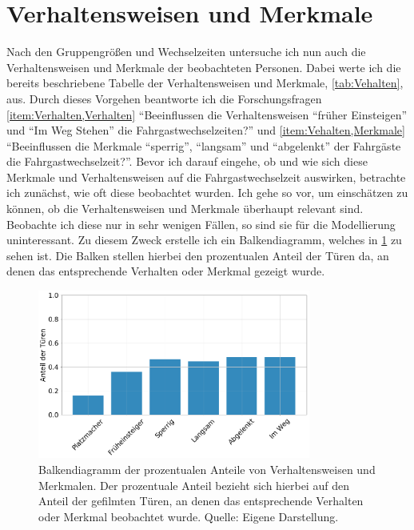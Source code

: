 \section{Verhaltensweisen und Merkmale} \label{Verhalten}
Nach den Gruppengrößen und Wechselzeiten untersuche ich nun auch die Verhaltensweisen und Merkmale der beobachteten Personen. Dabei werte ich die bereits beschriebene Tabelle der Verhaltensweisen und Merkmale, \tablename \ref{tab:Vehalten}, aus. Durch dieses Vorgehen beantworte ich die Forschungsfragen \ref{item:Verhalten,Verhalten} "`Beeinflussen die Verhaltensweisen "`früher Einsteigen"' und "`Im Weg Stehen"' die Fahrgastwechselzeiten?"' und \ref{item:Vehalten,Merkmale} "`Beeinflussen die Merkmale "`sperrig"', "`langsam"' und "`abgelenkt"' der Fahrgäste die Fahrgastwechselzeit?"'. Bevor ich darauf eingehe, ob und wie sich diese Merkmale und Verhaltensweisen auf die Fahrgastwechselzeit auswirken, betrachte ich zunächst, wie oft diese beobachtet wurden. Ich gehe so vor, um einschätzen zu können, ob die Verhaltensweisen und Merkmale überhaupt relevant sind. Beobachte ich diese nur in sehr wenigen Fällen, so sind sie für die Modellierung uninteressant. Zu diesem Zweck erstelle ich ein Balkendiagramm, welches in \figurename \ref{fig:BalkenVerhalten} zu sehen ist. Die Balken stellen hierbei den prozentualen Anteil der Türen da, an denen das entsprechende Verhalten oder Merkmal gezeigt wurde.
\begin{figure}[H]
	\centering
		\includegraphics[width=0.8\textwidth]{pictures/data_evaluation/behavior/counts_behavoirs.png}
	\caption{Balkendiagramm der prozentualen Anteile von Verhaltensweisen und Merkmalen. Der prozentuale Anteil bezieht sich hierbei auf den Anteil der gefilmten Türen, an denen das entsprechende Verhalten oder Merkmal beobachtet wurde. Quelle: Eigene Darstellung.}
	\label{fig:BalkenVerhalten}
\end{figure}
